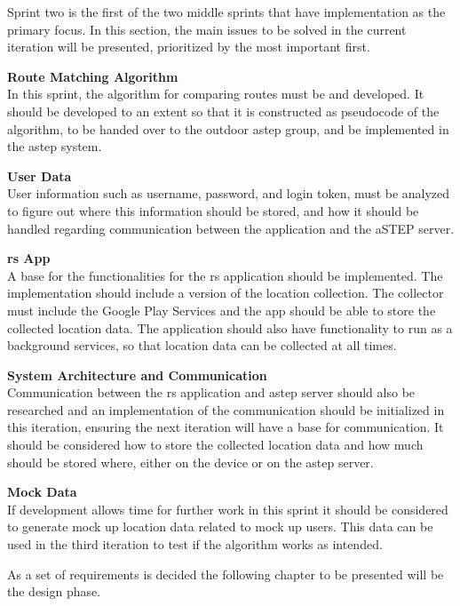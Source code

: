 Sprint two is the first of the two middle sprints that have implementation as the primary focus. In this section, the main issues to be solved in the current iteration will be presented, prioritized by the most important first.

\textbf{Route Matching Algorithm}\\
In this sprint, the algorithm for comparing routes must be and developed. 
It should be developed to an extent so that it is constructed as pseudocode of the algorithm, to be handed over to the outdoor \gls{astep} group, and be implemented in the \gls{astep} system.

\textbf{User Data}\\
User information such as username, password, and login token, must be analyzed to figure out where this information should be stored, and how it should be handled regarding communication between the application and the aSTEP server. 

\textbf{\gls{rs} App}\\
A base for the functionalities for the \gls{rs} application should be implemented. 
The implementation should include a version of the location collection.
The collector must include the Google Play Services and the app should be able to store the collected location data. 
The application should also have functionality to run as a background services, so that location data can be collected at all times.

\textbf{System Architecture and Communication}\\
Communication between the \gls{rs} application and \gls{astep} server should also be researched and an implementation of the communication should be initialized in this iteration, ensuring the next iteration will have a base for communication. 
It should be considered how to store the collected location data and how much should be stored where, either on the device or on the \gls{astep} server.

\textbf{Mock Data}\\
If development allows time for further work in this sprint it should be considered to generate mock up location data related to mock up users. 
This data can be used in the third iteration to test if the algorithm works as intended.

As a set of requirements is decided the following chapter to be presented will be the design phase.